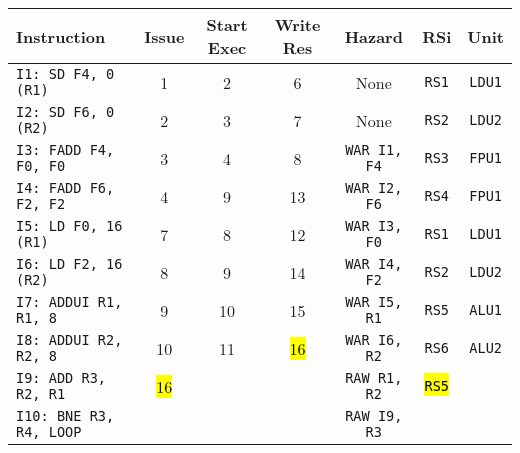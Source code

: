 \begin{enumerate}
    \begin{table}[!htp]
        \centering
        \begin{adjustbox}{width={\textwidth},totalheight={\textheight},keepaspectratio}
        \begin{tabular}{@{} l c c c c c c @{}}
            \toprule
            \textbf{Instruction} & \textbf{Issue} & \textbf{Start Exec} & \textbf{Write Res} & \textbf{Hazard} & \textbf{RSi} & \textbf{Unit} \\
            \midrule
            \texttt{I1: SD F4, 0 (R1)}      & 1 & 2 & 6 & None  & \texttt{RS1}   & \texttt{LDU1}  \\ [.5em]
            \texttt{I2: SD F6, 0 (R2)}      & 2 & 3 & 7 & None  & \texttt{RS2}   & \texttt{LDU2}  \\ [.5em]
            \texttt{I3: FADD F4, F0, F0}    & 3 & 4 & 8 & \texttt{WAR I1, F4}  & \texttt{RS3} & \texttt{FPU1} \\ [.5em]
            \texttt{I4: FADD F6, F2, F2}    & 4 & 9 & 13 & \texttt{WAR I2, F6} & \texttt{RS4} & \texttt{FPU1} \\ [.5em]
            \texttt{I5: LD F0, 16 (R1)}     & 7 & 8 & 12 & \texttt{WAR I3, F0} & \texttt{RS1} & \texttt{LDU1} \\ [.5em]
            \texttt{I6: LD F2, 16 (R2)}     & 8 & 9 & 14 & \texttt{WAR I4, F2} & \texttt{RS2} & \texttt{LDU2} \\ [.5em]
            \texttt{I7: ADDUI R1, R1, 8}    & 9 & 10 & 15 & \texttt{WAR I5, R1} & \texttt{RS5} & \texttt{ALU1} \\ [.5em]
            \texttt{I8: ADDUI R2, R2, 8}    & 10 & 11 & \hl{16} & \texttt{WAR I6, R2} & \texttt{RS6} & \texttt{ALU2} \\ [.5em]
            \texttt{I9: ADD R3, R2, R1}     & \hl{16} &   &   & \texttt{RAW R1, R2} & \hl{\texttt{RS5}} &       \\ [.5em]
            \texttt{I10: BNE R3, R4, LOOP}   &   &   &   & \texttt{RAW I9, R3} &       &       \\
            \bottomrule
        \end{tabular}
        \end{adjustbox}
    \end{table}
    

\end{enumerate}
